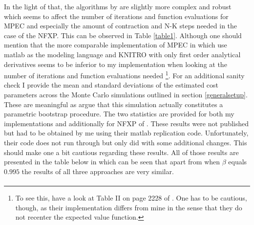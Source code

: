 In the light of that, the algorithms by \citeauthor{Iskhakov.2016} are slightly more complex and robust which seems to affect the number of iterations and function evaluations for MPEC and especially the amount of contraction and N-K steps needed in the case of the NFXP. This can be observed in Table \ref{table1}. Although one should mention that the more comparable implementation of MPEC in which \cite{Su.Judd.2012} use matlab as the modeling language and KNITRO with only first order analytical derivatives seems to be inferior to my implementation when looking at the number of iterations and function evaluations needed \footnote{To see this, have a look at Table II on page 2228 of \cite{Su.Judd.2012}. One has to be cautious, though, as their implementation differs from mine in the sense that they do not recenter the expected value function.}. For an additional sanity check I provide the mean and standard deviations of the estimated cost parameters across the Monte Carlo simulations outlined in section \ref{generalsetup}. These are meaningful as \cite{Su.Judd.2012} argue that this simulation actually constitutes a parametric bootstrap procedure. The two statistics are provided for both my implementations and additionally for NFXP of \citeauthor{Iskhakov.2016}. These results were not published but had to be obtained by me using their matlab replication code. Unfortunately, their code does not run through but only did with some additional changes. This should make one a bit cautious regarding these results. All of those results are presented in the table below in which can be seen that apart from when $\beta$ equals $0.995$ the results of all three approaches are very similar. \paragraph{}

